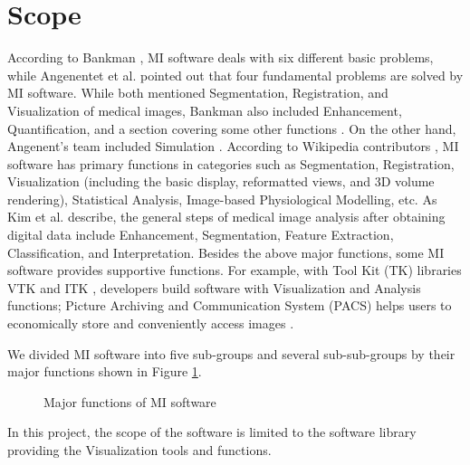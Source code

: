 \section{Scope}
\label{sec_scope}
According to Bankman \cite{Bankman2000}, MI software deals with six different basic problems, while Angenentet et al. \cite{Angenent2006} pointed out that four fundamental problems are solved by MI software. While both mentioned Segmentation, Registration, and Visualization of medical images, Bankman also included Enhancement, Quantification, and a section covering some other functions \cite{Bankman2000}. On the other hand, Angenent's team included Simulation \cite{Angenent2006}. According to Wikipedia contributors \cite{enwiki:1034877594}, MI software has primary functions in categories such as Segmentation, Registration, Visualization (including the basic display, reformatted views, and 3D volume rendering), Statistical Analysis, Image-based Physiological Modelling, etc. As Kim et al. \cite{Kim2011} describe, the general steps of medical image analysis after obtaining digital data include Enhancement, Segmentation, Feature Extraction, Classification, and Interpretation. Besides the above major functions, some MI software provides supportive functions. For example, with Tool Kit (TK) libraries VTK \cite{SchroederEtAl2006} and ITK \cite{McCormick2014}, developers build software with Visualization and Analysis functions; Picture Archiving and Communication System (PACS) helps users to economically store and conveniently access images \cite{Choplin1992}. 

We divided MI software into five sub-groups and several sub-sub-groups by their major functions shown in Figure \ref{fig_mi_functions}.

\begin{figure}
\centering
{}
\caption{Major functions of MI software}
\label{fig_mi_functions}
\end{figure}

In this project, the scope of the software is limited to the software library providing the Visualization tools and functions.
